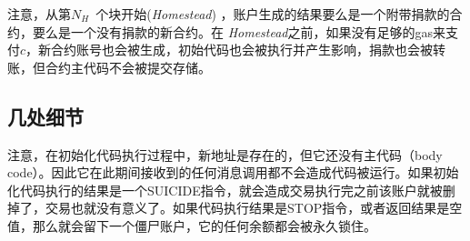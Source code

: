 \documentclass[UTF8,nofonts]{ctexart}
\newcommand{\firsthomesteadblock}{\ensuremath{N_H}}
\begin{document}
\begin{multicols}{2}
注意，从第\firsthomesteadblock\ 个块开始({\it Homestead}) ，账户生成的结果要么是一个附带捐款的合约，要么是一个没有捐款的新合约。在 {\it Homestead}之前，如果没有足够的gas来支付$c$，新合约账号也会被生成，初始代码也会被执行并产生影响，捐款也会被转账，但合约主代码不会被提交存储。

\subsection{几处细节}
注意，在初始化代码执行过程中，新地址是存在的，但它还没有主代码（body code）。因此它在此期间接收到的任何消息调用都不会造成代码被运行。如果初始化代码执行的结果是一个{\small SUICIDE}指令，就会造成交易执行完之前该账户就被删掉了，交易也就没有意义了。如果代码执行结果是{\small STOP}指令，或者返回结果是空值，那么就会留下一个僵尸账户，它的任何余额都会被永久锁住。





\end{multicols}
\end{document}
